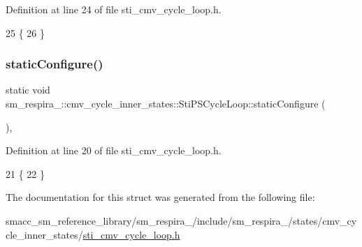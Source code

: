 Definition at line 24 of file sti\+\_\+cmv\+\_\+cycle\+\_\+loop.\+h.


\begin{DoxyCode}
25   \{
26   \}
\end{DoxyCode}
\mbox{\label{structsm__respira__1_1_1cmv__cycle__inner__states_1_1StiPSCycleLoop_a7856305b3ed2b17640521d53f00c9547}} 
\subsubsection{\texorpdfstring{static\+Configure()}{staticConfigure()}}
{\footnotesize\ttfamily static void sm\+\_\+respira\+\_\+::cmv\+\_\+cycle\+\_\+inner\+\_\+states\+::\+Sti\+P\+S\+Cycle\+Loop\+::static\+Configure (\begin{DoxyParamCaption}{ }\end{DoxyParamCaption})\hspace{0.3cm}{\ttfamily [inline]}, {\ttfamily [static]}}



Definition at line 20 of file sti\+\_\+cmv\+\_\+cycle\+\_\+loop.\+h.


\begin{DoxyCode}
21   \{
22   \}
\end{DoxyCode}


The documentation for this struct was generated from the following file\+:\begin{DoxyCompactItemize}
\item 
smacc\+\_\+sm\+\_\+reference\+\_\+library/sm\+\_\+respira\+\_/include/sm\+\_\+respira\+\_/states/cmv\+\_\+cycle\+\_\+inner\+\_\+states/\hyperlink{sti__cmv__cycle__loop_8h}{sti\+\_\+cmv\+\_\+cycle\+\_\+loop.\+h}\end{DoxyCompactItemize}
